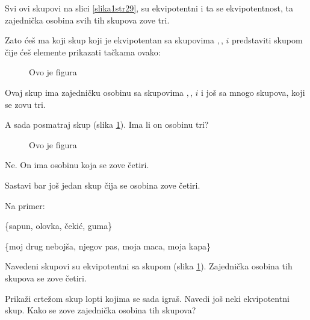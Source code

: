      Svi ovi skupovi na slici \ref{slika1str29}, su ekvipotentni i ta se ekvipotentnost, ta zajedni\v cka osobina svih tih skupova zove tri.



     Zato \' ce\v s ma koji skup koji je ekvipotentan sa skupovima $, $, $ i $ predstaviti skupom \v cije \' ce\v s elemente prikazati ta\v ckama ovako: 

        \begin{figure}[h]

            \center


            \caption{Ovo je figura}

        \end{figure} 



        Ovaj skup ima zajedni\v cku osobinu sa skupovima $, $, $ i $ i jo\v s sa mnogo skupova, koji se zovu tri.

        \begin{zad}

            A sada posmatraj skup (slika \ref{slika1str30}). Ima li on osobinu tri?

        \end{zad}

         \begin{figure}[h]

          \center


          \caption{Ovo je figura}\label{slika1str30}

        \end{figure} 



    Ne. On ima osobinu koja se zove \v cetiri.



   Sastavi bar jo\v s jedan skup \v cija se osobina zove \v cetiri.



   Na primer:

   \{sapun, olovka, \v ceki\' c, guma\}



   \{moj drug neboj\v sa, njegov pas, moja maca, moja kapa\}\

   Navedeni skupovi su ekvipotentni sa skupom (slika \ref{slika1str30}). Zajedni\v cka osobina tih skupova se zove \v cetiri.

   \begin{zad}

       Prika\v zi crte\v zom skup lopti kojima se sada igra\v s. Navedi jo\v s neki ekvipotentni skup. Kako se zove zajedni\v cka osobina tih skupova?

   \end{zad}

